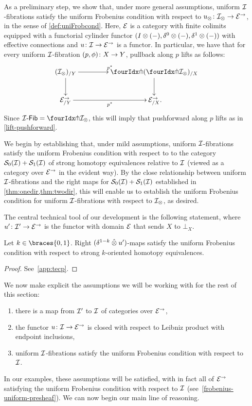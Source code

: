 \documentclass[reqno,10pt,a4paper,oneside,draft]{amsart}
\begin{document}
As a preliminary step, we show that, under more general assumptions, uniform $\cal{I}$-fibrations satisfy the uniform Frobenius condition with respect to $u_\otimes \co \cal{I}_\otimes \to \cal{E}^\to$, in the sense of \cref{def:uniFrobcond}. Here, $\catE$ is a category with finite colimits equipped with a functorial cylinder functor $(\interval \otimes (-), \lcyl \otimes (-), \rcyl \otimes (-))$ with effective connections and  $u \co \cal{I} \to \catE^\to$ is a functor.
In particular, we  have that for every uniform $\cal{I}$-fibration $(p, \phi) \co X \to Y$, pullback along $p$ lifts as follows:
\[
\xymatrix@C+2em{
  (\cal{I}_\otimes)_{/Y}
  \ar[r]^{p^*}
  \ar[d]
&
  \liftl{(\liftr{\cal{I}_\otimes})}_{/X}
  \ar[d]
\\
  \cal{E}^\to_{/Y}
  \ar[r]_{p^*}
&
  \cal{E}^\to_{/X}
\rlap{.}}
\]
Since $\Fib{\cal{I}}  = \liftr{\cal{I}_\otimes}$, this will imply that pushforward along $p$ lifts as in \cref{lift-pushforward}.

We begin by establishing that,  under mild assumptions, uniform $\cal{I}$-fibrations satisfy the uniform Frobenius condition with respect to to the category $\cal{S}_0(\cal{I}) + \cal{S}_1(\cal{I})$ of strong homotopy equivalences relative to $\cal{I}$ (viewed as a category over $\cal{E}^\to$ in the evident way).
By the close relationship between uniform $\cal{I}$-fibrations and the right maps for $\cal{S}_0(\cal{I}) + \cal{S}_1(\cal{I})$ established in \cref{thm:onedir,thm:twodir}, this will enable us to establish the uniform Frobenius condition for uniform $\cal{I}$-fibrations with respect to $\cal{I}_\otimes$, as desired.


The central technical tool of our development is the following statement, where
$u' \co \cal{I}' \to \cal{E}^\to$ is the functor with domain $\cal{E}$ that sends $X$ to $\bot_X$.

\begin{lemma} \label{technical}
Let $k \in \braces{0, 1}$.
Right $(\delta^{1-k} \hatotimes u')$-maps satisfy the uniform Frobenius condition with respect to strong $k$-oriented homotopy equivalences.
\end{lemma}

\begin{proof}
See~\cref{app:tecp}.
\end{proof}

We now make explicit the assumptions we will be working with for the rest of this section:
\begin{enumerate}[(1)]
\item 
there is a map from $\cal{I}'$ to $\cal{I}$ of categories over $\cal{E}^\to$,
\item
the functor $u \co \cal{I} \to \catE^\to$ is closed with respect to Leibniz product with endpoint inclusions,
\item
uniform $\cal{I}$-fibrations satisfy the uniform Frobenius condition with respect to $\cal{I}$.
\end{enumerate}
In our examples, these assumptions will be satisfied, with in fact all of $\catE^\to$ satisfying the uniform Frobenius condition with respect to $\cal{I}$ (see~\cref{frobenius-uniform-presheaf}).
We can now begin our main line of reasoning.
\end{document}
